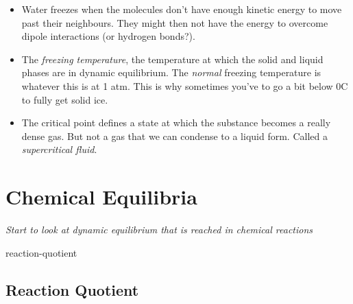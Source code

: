 \documentclass[12pt]{article}
\begin{document}
\begin{itemize}
\item
  Water freezes when the molecules don't have enough kinetic energy to
  move past their neighbours. They might then not have the energy to
  overcome dipole interactions (or hydrogen bonds?).
\item
  The \emph{freezing temperature}, the temperature at which the solid
  and liquid phases are in dynamic equilibrium. The \emph{normal}
  freezing temperature is whatever this is at 1 atm. This is why
  sometimes you've to go a bit below 0C to fully get solid ice.
\item
  The critical point defines a state at which the substance becomes a
  really dense gas. But not a gas that we can condense to a liquid form.
  Called a \emph{supercritical fluid}.
\end{itemize}

\section{Chemical Equilibria}\label{chemical-equilibria}

\emph{Start to look at dynamic equilibrium that is reached in chemical
reactions}

 {reaction-quotient}{%
\subsection{Reaction Quotient}\label{reaction-quotient}}
\end{document}
